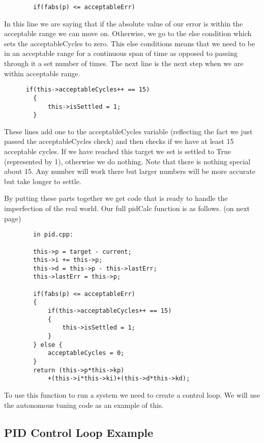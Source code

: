 \documentclass[12pt]{article}
\begin{document}
    \begin{verbatim}
        if(fabs(p) <= acceptableErr)
    \end{verbatim}

    In this line we are saying that if the absolute value of our error is within the acceptable range we can move on. Otherwise, we go to the else condition which sets the acceptableCycles to zero. This else conditions means that we need to be in an acceptable range for a continuous span of time as opposed to passing through it a set number of times. The next line is the next step when we are within acceptable range.

    \begin{verbatim}
      if(this->acceptableCycles++ == 15)
        {
            this->isSettled = 1;
        }
    \end{verbatim}

    These lines add one to the acceptableCycles variable (reflecting the fact we just passed the acceptableCycles check) and then checks if we have at least 15 acceptable cycles. If we have reached this target we set is settled to True (represented by 1), otherwise we do nothing. Note that there is nothing special about 15. Any number will work there but larger numbers will be more accurate but take longer to settle.

    By putting these parts together we get code that is ready to handle the imperfection of the real world. Our full pidCalc function is as follows. (on next page)

    \begin{verbatim}
        in pid.cpp:

        this->p = target - current;
        this->i += this->p;
        this->d = this->p - this->lastErr;
        this->lastErr = this->p;

        if(fabs(p) <= acceptableErr)
        {
            if(this->acceptableCycles++ == 15)
            {
                this->isSettled = 1;
            }
        } else {
            acceptableCycles = 0;
        }
        return (this->p*this->kp)
            +(this->i*this->ki)+(this->d*this->kd);
    \end{verbatim}

    To use this function to run a system we need to create a control loop. We will use the autonomous tuning code as an example of this.

\subsection{PID Control Loop Example}
\end{document}

